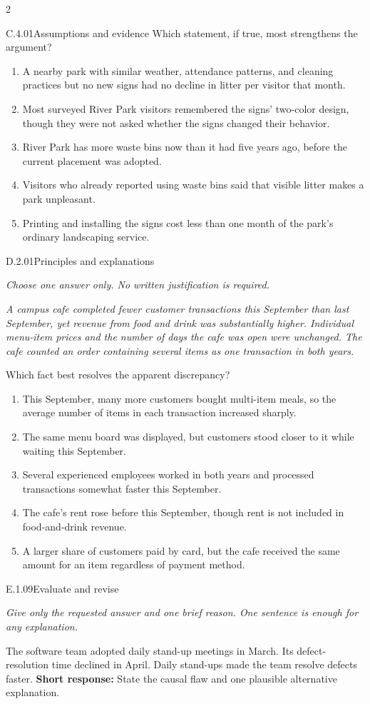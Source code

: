 \documentclass[9pt]{extarticle}
\newcommand{\choice}[1]{\item #1}
\begin{document}
\begin{multicols}{2}
\begin{DenseCoreProblem}{C.4.01}{Assumptions and evidence}
Which statement, if true, most strengthens the argument?
\begin{enumerate}[label=(\alph*)]
  \choice{A nearby park with similar weather, attendance patterns, and cleaning practices but no new signs had no decline in litter per visitor that month.}
  \choice{Most surveyed River Park visitors remembered the signs' two-color design, though they were not asked whether the signs changed their behavior.}
  \choice{River Park has more waste bins now than it had five years ago, before the current placement was adopted.}
  \choice{Visitors who already reported using waste bins said that visible litter makes a park unpleasant.}
  \choice{Printing and installing the signs cost less than one month of the park's ordinary landscaping service.}
\end{enumerate}
\end{DenseCoreProblem}
\begin{DenseCoreProblem}{D.2.01}{Principles and explanations}
{\scriptsize\textit{Choose one answer only. No written justification is required.}\par}
\emph{A campus cafe completed fewer customer transactions this September than last September, yet revenue from food and drink was substantially higher. Individual menu-item prices and the number of days the cafe was open were unchanged. The cafe counted an order containing several items as one transaction in both years.}

Which fact best resolves the apparent discrepancy?
\begin{enumerate}[label=(\alph*)]
  \choice{This September, many more customers bought multi-item meals, so the average number of items in each transaction increased sharply.}
  \choice{The same menu board was displayed, but customers stood closer to it while waiting this September.}
  \choice{Several experienced employees worked in both years and processed transactions somewhat faster this September.}
  \choice{The cafe's rent rose before this September, though rent is not included in food-and-drink revenue.}
  \choice{A larger share of customers paid by card, but the cafe received the same amount for an item regardless of payment method.}
\end{enumerate}
\end{DenseCoreProblem}
\begin{DenseCoreProblem}{E.1.09}{Evaluate and revise}
{\scriptsize\textit{Give only the requested answer and one brief reason. One sentence is enough for any explanation.}\par}
The software team adopted daily stand-up meetings in March. Its defect-resolution time declined in April. Daily stand-ups made the team resolve defects faster.
\textbf{Short response:} State the causal flaw and one plausible alternative explanation.
\end{DenseCoreProblem}
\end{multicols}
\end{document}
